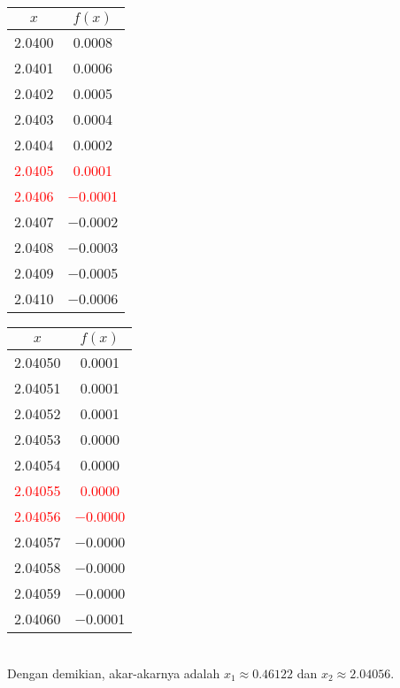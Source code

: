 \documentclass{article}
\begin{document}
\begin{enumerate}
\begin{enumerate}
\begin{tabular}{|c|c|}
            \hline
            $x$   & $f(x)$ \\
            \hline
            \num{2,0400} & \num{0,0008} \\
            \num{2,0401} & \num{0,0006} \\
            \num{2,0402} & \num{0,0005} \\
            \num{2,0403} & \num{0,0004} \\
            \num{2,0404} & \num{0,0002} \\
            \textcolor{red}{\num{2,0405}} & \textcolor{red}{\num{0,0001}} \\
            \textcolor{red}{\num{2,0406}} & \textcolor{red}{\num{-0,0001}} \\
            \num{2,0407} & \num{-0,0002} \\
            \num{2,0408} & \num{-0,0003} \\
            \num{2,0409} & \num{-0,0005} \\
            \num{2,0410} & \num{-0,0006} \\
            \hline
            \end{tabular}\quad
            \begin{tabular}{|c|c|}
            \hline
            $x$   & $f(x)$ \\
            \hline
            \num{2,04050} & \num{0,0001} \\
            \num{2,04051} & \num{0,0001} \\
            \num{2,04052} & \num{0,0001} \\
            \num{2,04053} & \num{0,0000} \\
            \num{2,04054} & \num{0,0000} \\
            \textcolor{red}{\num{2,04055}} & \textcolor{red}{\num{0,0000}} \\
            \textcolor{red}{\num{2,04056}} & \textcolor{red}{\num{-0,0000}} \\
            \num{2,04057} & \num{-0,0000} \\
            \num{2,04058} & \num{-0,0000} \\
            \num{2,04059} & \num{-0,0000} \\
            \num{2,04060} & \num{-0,0001} \\
            \hline
            \end{tabular}\quad \\         
            
        Dengan demikian, akar-akarnya adalah $x_1 \approx \num{0,46122}$ dan $x_2 \approx \num{2,04056}$.
    

\end{enumerate}
\end{enumerate}
\end{document}
